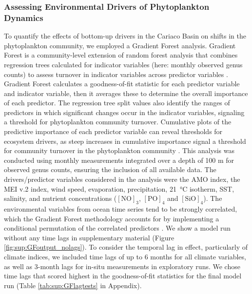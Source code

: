 \documentclass[draft]{agujournal2019}
\begin{document}
    \subsubsection{Assessing Environmental Drivers of Phytoplankton Dynamics}
    To quantify the effects of bottom-up drivers in the Cariaco Basin on shifts in the phytoplankton community, we employed a Gradient Forest analysis. Gradient Forest is a community-level extension of random forest analysis that combines regression trees calculated for indicator variables (here: monthly observed genus counts) to assess turnover in indicator variables across predictor variables \cite{pitcher_example_2012, large_critical_2015, tam_comparing_2017}. Gradient Forest calculates a goodness-of-fit statistic for each predictor variable and indicator variable, then it averages these to determine the overall importance of each predictor. The regression tree split values also identify the ranges of predictors in which significant changes occur in the indicator variables, signaling a threshold for phytoplankton community turnover. Cumulative plots of the predictive importance of each predictor variable can reveal thresholds for ecosystem drivers, as steep increases in cumulative importance signal a threshold for community turnover in the phytoplankton community \cite{tam_comparing_2017}. This analysis was conducted using monthly measurements integrated over a depth of 100 m for observed genus counts, ensuring the inclusion of all available data. The drivers/predictor variables considered in the analysis were the AMO index, the MEI v.2 index, wind speed, evaporation, precipitation, \qty{21}{\celsius} isotherm, SST, salinity, and nutrient concentrations ($\mathrm{[NO]}_3$, $\mathrm{[PO]}_4$ and $\mathrm{[SiO]}_4$). 
    The environmental variables from ocean time series tend to be strongly correlated, which the Gradient Forest methodology accounts for by implementing a conditional permutation of the correlated predictors \cite{ellis_gradient_2012}. 
    We show a model run without any time lags in  supplementary material (Figure \ref{fig:sup:GFoutput_nolags}). To consider the temporal lag in effect, particularly of climate indices, we included time lags of up to 6 months for all climate variables, as well as 3-month lags for in-situ measurements in exploratory runs. We chose time lags that scored highest in the goodness-of-fit statistics for the final model run (Table \ref{tab:sup:GFlagtests} in Appendix). 
\end{document}
